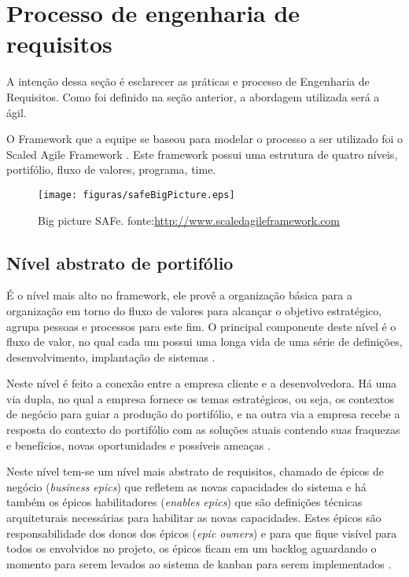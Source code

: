 \section{Processo de engenharia de requisitos}

A intenção dessa seção é esclarecer as práticas e processo de Engenharia de Requisitos. Como foi definido na seção anterior, a abordagem utilizada será a ágil.

O Framework que a equipe se baseou para modelar o processo a ser utilizado foi o Scaled Agile Framework \cite{safe}. Este framework possui uma estrutura de quatro níveis, portifólio, fluxo de valores, programa, time.

\begin{figure}[H]
    \centering
    \label{safeBigPicture}
    \texttt{[image: figuras/safeBigPicture.eps]}
    \caption[Big picture SAFe]{Big picture SAFe. fonte:\url{http://www.scaledagileframework.com}}
\end{figure}

\subsection{Nível abstrato de portifólio}

É o nível mais alto no framework, ele provê a organização básica para a organização em torno do fluxo de valores para alcançar o objetivo estratégico, agrupa pessoas e processos para este fim. O principal componente deste nível é o fluxo de valor, no qual cada um possui uma longa vida de uma série de definições, desenvolvimento, implantação de sistemas \cite{safe}.

Neste nível é feito a conexão entre a empresa cliente e a desenvolvedora. Há uma via dupla, no qual a empresa fornece os temas estratégicos, ou seja, os contextos de negócio para guiar a produção do portifólio, e na outra via a empresa recebe a resposta do contexto do portifólio com as soluções atuais contendo suas fraquezas e benefícios, novas oportunidades e possíveis ameaças \cite{safe}.

Neste nível tem-se um nível mais abstrato de requisitos, chamado de épicos de negócio (\textit{business epics}) que refletem as novas capacidades do sistema e há também os épicos habilitadores (\textit{enables epics}) que são definições técnicas arquiteturais necessárias para habilitar as novas capacidades. Estes épicos são responsabilidade dos donos dos épicos (\textit{epic owners}) e para que fique visível para todos os envolvidos no projeto, os épicos ficam em um backlog aguardando o momento para serem levados ao sistema de kanban para serem implementados \cite{safe}.

